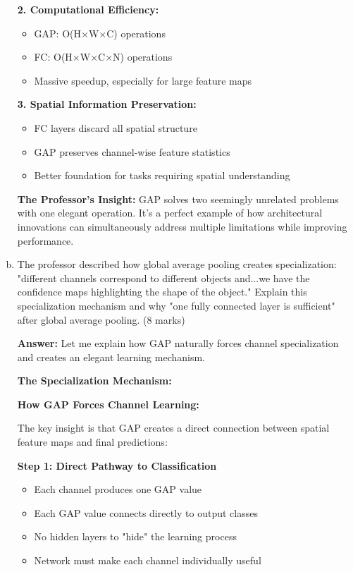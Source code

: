 \documentclass[12pt]{article}
\newcommand{\answer}[1]{{\color{answercolor}\textbf{Answer:} #1}}
\newcommand{\explanation}[1]{{\color{explanationcolor}#1}}
\begin{document}
\begin{enumerate}[(a)]
{{    \textbf{2. Computational Efficiency:}
    \begin{itemize}
        \item GAP: O(H×W×C) operations
        \item FC: O(H×W×C×N) operations  
        \item Massive speedup, especially for large feature maps
    \end{itemize}
    
    \textbf{3. Spatial Information Preservation:}
    \begin{itemize}
        \item FC layers discard all spatial structure
        \item GAP preserves channel-wise feature statistics
        \item Better foundation for tasks requiring spatial understanding
    \end{itemize}
    }
    
    \textbf{The Professor's Insight:}
    \explanation{
    GAP solves two seemingly unrelated problems with one elegant operation. It's a perfect example of how architectural innovations can simultaneously address multiple limitations while improving performance.
    }
    }
    
    \item The professor described how global average pooling creates specialization: "different channels correspond to different objects and...we have the confidence maps highlighting the shape of the object." Explain this specialization mechanism and why "one fully connected layer is sufficient" after global average pooling. \hfill (8 marks)
    
    \answer{
    Let me explain how GAP naturally forces channel specialization and creates an elegant learning mechanism.
    
    \textbf{The Specialization Mechanism:}
    
    \explanation{
    \textbf{How GAP Forces Channel Learning:}
    
    The key insight is that GAP creates a direct connection between spatial feature maps and final predictions:
    
    \textbf{Step 1: Direct Pathway to Classification}
    \begin{itemize}
        \item Each channel produces one GAP value
        \item Each GAP value connects directly to output classes
        \item No hidden layers to "hide" the learning process
        \item Network must make each channel individually useful
    \end{itemize}
    
}}
\end{enumerate}
\end{document}

